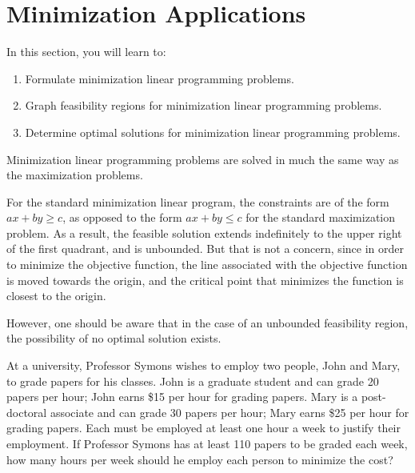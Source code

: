 \section{Minimization Applications}

In this section, you will learn to:
\begin{enumerate}
    \item Formulate minimization linear programming problems.
    \item Graph feasibility regions for minimization linear programming problems.
    \item Determine optimal solutions for minimization linear programming problems.
\end{enumerate}

Minimization linear programming problems are solved in much the same way as the maximization problems.

For the standard minimization linear program, the constraints are of the form $ax + by \geq c$, as opposed to the form $ax + by \leq c$ for the standard maximization problem.  As a result, the feasible solution extends indefinitely to the upper right of the first quadrant, and is unbounded.   But that is not a concern, since in order to minimize the objective function, the line associated with the objective function is moved towards the origin, and the critical point that minimizes the function is closest to the origin.

However, one should be aware that in the case of an unbounded feasibility region, the possibility of no optimal solution exists.

\begin{example}
    At a university, Professor Symons wishes to employ two people, John and Mary, to grade papers for his classes. John is a graduate student and can grade 20 papers per hour; John earns \$15 per hour for grading papers. Mary is a post-doctoral associate and can grade 30 papers per hour; Mary earns \$25 per hour for grading papers. Each must be employed at least one hour a week to justify their employment.
    If Professor Symons has at least 110 papers to be graded each week, how many hours per week should he employ each person to minimize the cost?
\end{example}

